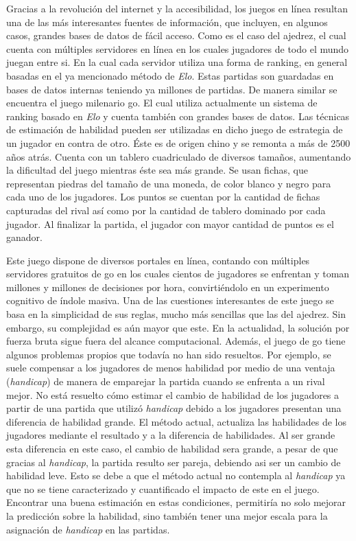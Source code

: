 \documentclass[11pt,twoside,spanish]{report} %
\begin{document}
Gracias a la revoluci\'on del internet y la accesibilidad, los juegos en l\'inea resultan una de las m\'as interesantes fuentes de informaci\'on, que incluyen, en algunos casos, grandes bases de datos de f\'acil acceso.
Como es el caso del ajedrez, el cual cuenta con m\'ultiples servidores en l\'inea en los cuales jugadores de todo el mundo juegan entre si.
En la cual cada servidor utiliza una forma de ranking, en general basadas en el ya mencionado m\'etodo de \textit{Elo}.
Estas partidas son guardadas en bases de datos internas teniendo ya millones de partidas.
De manera similar se encuentra el juego milenario go.
El cual utiliza actualmente un sistema de ranking basado en \textit{Elo} y cuenta tambi\'en con grandes bases de datos.
Las t\'ecnicas de estimaci\'on de habilidad pueden ser utilizadas en dicho juego de estrategia de un jugador en contra de otro.
\'Este es de origen chino y se remonta a m\'as de 2500 a\~nos atr\'as.
Cuenta con un tablero cuadriculado de diversos tama\~nos, aumentando la dificultad del juego mientras \'este sea m\'as grande.
Se usan fichas, que representan piedras del tama\~no de una moneda, de color blanco y negro para cada uno de los jugadores.
Los puntos se cuentan por la cantidad de fichas capturadas del rival as\'i como por la cantidad de tablero dominado por cada jugador.
Al finalizar la partida, el jugador con mayor cantidad de puntos es el ganador.

Este juego dispone de diversos portales en l\'inea, contando con m\'ultiples servidores gratuitos de go en los cuales cientos de jugadores se enfrentan y toman millones y millones de decisiones por hora, convirti\'endolo en un experimento cognitivo de \'indole masiva.
Una de las cuestiones interesantes de este juego se basa en la simplicidad de sus reglas, mucho m\'as sencillas que las del ajedrez.
Sin embargo, su complejidad es a\'un mayor que este.
En la actualidad, la soluci\'on por fuerza bruta sigue fuera del alcance computacional.
Adem\'as, el juego de go tiene algunos problemas propios que todav\'ia no han sido resueltos.
Por ejemplo, se suele compensar a los jugadores de menos habilidad por medio de una ventaja (\emph{handicap}) de manera de emparejar la partida cuando se enfrenta a un rival mejor.
No est\'a resuelto c\'omo estimar el cambio de habilidad de los jugadores a partir de una partida que utiliz\'o \emph{handicap} debido a los jugadores presentan una diferencia de habilidad grande.
El m\'etodo actual, actualiza las habilidades de los jugadores mediante el resultado y a la diferencia de habilidades.
Al ser grande esta diferencia en este caso, el cambio de habilidad sera grande, a pesar de que gracias al \emph{handicap}, la partida resulto ser pareja, debiendo asi ser un cambio de habilidad leve.
Esto se debe a que el m\'etodo actual no contempla al \emph{handicap} ya que no se tiene caracterizado y cuantificado el impacto de este en el juego.
Encontrar una buena estimaci\'on en estas condiciones, permitir\'ia no solo mejorar la predicci\'on sobre la habilidad, sino tambi\'en tener una mejor escala para la asignaci\'on de \emph{handicap} en las partidas.
\end{document}
